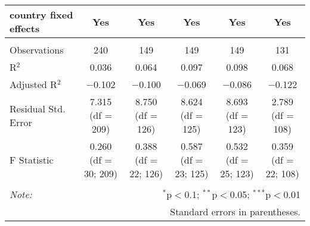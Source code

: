 \begin{tabular}{@{\extracolsep{5pt}}lccccc}
country fixed effects & Yes & Yes & Yes & Yes & Yes \\ 
\hline \\[-1.8ex] 
Observations & 240 & 149 & 149 & 149 & 131 \\ 
R$^{2}$ & 0.036 & 0.064 & 0.097 & 0.098 & 0.068 \\ 
Adjusted R$^{2}$ & $-$0.102 & $-$0.100 & $-$0.069 & $-$0.086 & $-$0.122 \\ 
Residual Std. Error & 7.315 (df = 209) & 8.750 (df = 126) & 8.624 (df = 125) & 8.693 (df = 123) & 2.789 (df = 108) \\ 
F Statistic & 0.260 (df = 30; 209) & 0.388 (df = 22; 126) & 0.587 (df = 23; 125) & 0.532 (df = 25; 123) & 0.359 (df = 22; 108) \\ 
\hline 
\hline \\[-1.8ex] 
\textit{Note:}  & \multicolumn{5}{r}{$^{*}$p$<$0.1; $^{**}$p$<$0.05; $^{***}$p$<$0.01} \\ 
 & \multicolumn{5}{r}{Standard errors in parentheses.} \\ 
\end{tabular} 
\endgroup 
